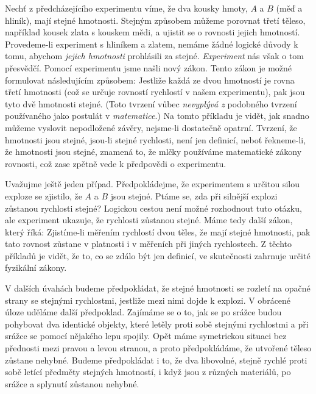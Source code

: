     Nechť z předcházejícího experimentu víme, že dva kousky hmoty, \(A\) a \(B\) (měď a hliník), 
    mají stejné hmotnosti. Stejným způsobem můžeme porovnat třetí těleso, například kousek zlata s 
    kouskem mědi, a ujistit se o rovnosti jejich hmotností. Provedeme-li experiment s hliníkem a 
    zlatem, nemáme žádné logické důvody k tomu, abychom \emph{jejich hmotnosti} prohlásili za 
    stejné. \emph{Experiment} nás však o tom přesvědčí. Pomocí experimentu jsme našli nový zákon. 
    Tento zákon je možné formulovat následujícím způsobem: Jestliže každá ze dvou hmotností je 
    rovna třetí hmotnosti (což se určuje rovností rychlostí v našem experimentu), pak jsou tyto dvě 
    hmotnosti stejné. (Toto tvrzení vůbec \emph{nevyplývá z} podobného tvrzení používaného jako 
    postulát v \emph{matematice}.) Na tomto příkladu je vidět, jak snadno můžeme vyslovit 
    nepodložené závěry, nejsme-li dostatečně opatrní. Tvrzení, že hmotnosti jsou stejné, jsou-li 
    stejné rychlosti, není jen definicí, neboť řekneme-li, že hmotnosti jsou stejné, znamená to, že 
    mlčky používáme matematické zákony rovnosti, což zase zpětně vede k předpovědi o experimentu.
    
    Uvažujme ještě jeden případ. Předpokládejme, že experimentem s určitou silou exploze se 
    zjistilo, že \(A\) a \(B\) jsou stejné. Ptáme se, zda při silnější explozi zůstanou rychlosti 
    stejné? Logickou cestou není možné rozhodnout tuto otázku, ale experiment ukazuje, že rychlosti 
    zůstanou stejné. Máme tedy další zákon, který říká: Zjistíme-li měřením rychlostí dvou těles, 
    že mají stejné hmotnosti, pak tato rovnost zůstane v platnosti i v měřeních při jiných 
    rychlostech. Z těchto příkladů je vidět, že to, co se zdálo být jen definicí, ve skutečnosti 
    zahrnuje určité fyzikální zákony.
    
    V dalších úvahách budeme předpokládat, že stejné hmotnosti se rozletí na opačné strany se 
    stejnými rychlostmi, jestliže mezi nimi dojde k explozi. V obrácené úloze uděláme další 
    předpoklad. Zajímáme se o to, jak se po srážce budou pohybovat dva identické objekty, které 
    letěly proti sobě stejnými rychlostmi a při srážce se pomocí nějakého lepu spojily. Opět máme 
    symetrickou situaci bez přednosti mezi pravou a levou stranou, a proto předpokládáme, že 
    utvořené těleso zůstane nehybné. Budeme předpokládat i to, že dva libovolné, stejně rychlé 
    proti sobě letící předměty stejných hmotností, i když jsou z různých materiálů, po srážce a 
    splynutí zůstanou nehybné.
        
